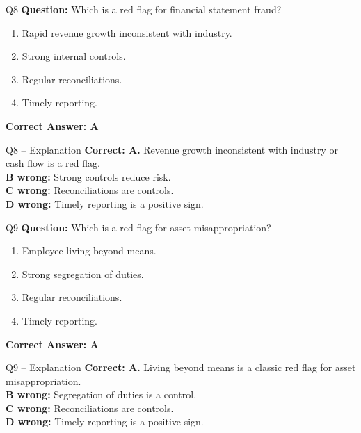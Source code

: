 \documentclass[aspectratio=169,10pt]{beamer}
\begin{document}
	\begin{frame}[t]{Q8}
		\small
		\textbf{Question:} Which is a red flag for financial statement fraud?
		\begin{enumerate}[label=\Alph*.,itemsep=1pt,topsep=2pt]
			\item Rapid revenue growth inconsistent with industry.
			\item Strong internal controls.
			\item Regular reconciliations.
			\item Timely reporting.
		\end{enumerate}
		\vspace{4pt}
		\textbf{Correct Answer: A}
	\end{frame}
	
	\begin{frame}[t]{Q8 -- Explanation}
		\small
		\textbf{Correct: A.} Revenue growth inconsistent with industry or cash flow is a red flag. \\[4pt]
		\textbf{B wrong:} Strong controls reduce risk. \\[2pt]
		\textbf{C wrong:} Reconciliations are controls. \\[2pt]
		\textbf{D wrong:} Timely reporting is a positive sign.
	\end{frame}
	
	\begin{frame}[t]{Q9}
		\small
		\textbf{Question:} Which is a red flag for asset misappropriation?
		\begin{enumerate}[label=\Alph*.,itemsep=1pt,topsep=2pt]
			\item Employee living beyond means.
			\item Strong segregation of duties.
			\item Regular reconciliations.
			\item Timely reporting.
		\end{enumerate}
		\vspace{4pt}
		\textbf{Correct Answer: A}
	\end{frame}
	
	\begin{frame}[t]{Q9 -- Explanation}
		\small
		\textbf{Correct: A.} Living beyond means is a classic red flag for asset misappropriation. \\[4pt]
		\textbf{B wrong:} Segregation of duties is a control. \\[2pt]
		\textbf{C wrong:} Reconciliations are controls. \\[2pt]
		\textbf{D wrong:} Timely reporting is a positive sign.
	\end{frame}
	
\end{document}
